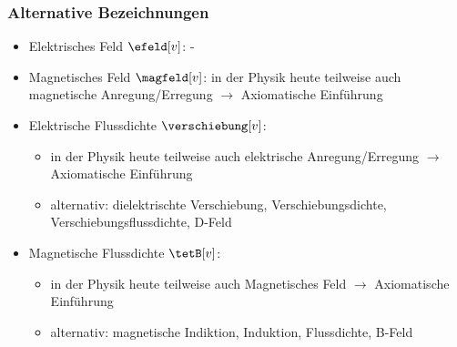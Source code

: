 \begin{frame}
  \frametitle{Alternative Bezeichnungen}
  \begin{itemize}[<+->]
    \item Elektrisches Feld $\efeld[v]$: - 
    \item Magnetisches Feld $\magfeld[v]$: in der Physik heute
      teilweise auch \alert{magnetische Anregung/Erregung} $\to$ Axiomatische
      Einführung
    \item Elektrische Flussdichte $\verschiebung[v]$:
      \begin{itemize}[<+->]
        \item in der Physik heute
      teilweise auch \alert{elektrische Anregung/Erregung} $\to$ Axiomatische
      Einführung
      \item alternativ: \alert{dielektrischte Verschiebung,
          Verschiebungsdichte, Verschiebungsflussdichte, D-Feld}
        \end{itemize}
      \item Magnetische Flussdichte $\tetB[v]$:
        \begin{itemize}[<+->]
          \item in der Physik heute
      teilweise auch \alert{Magnetisches Feld} $\to$ Axiomatische Einführung
      \item alternativ:
        \alert{magnetische Indiktion, Induktion, Flussdichte, B-Feld}
        \end{itemize}
  \end{itemize}    
      
  \end{frame}


